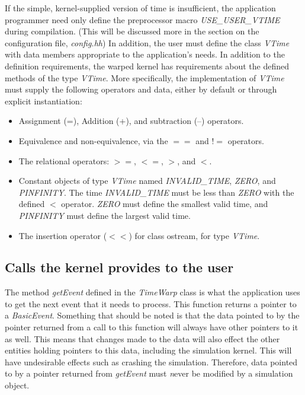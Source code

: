 \documentclass[11pt]{report}
\begin{document}
If the simple, kernel-supplied version of time is insufficient, the
application programmer need only define the preprocessor macro {\it
USE\_USER\_VTIME} during compilation. (This will be discussed more in the
section on the configuration file, {\it config.hh}) In addition, the user
must define the class {\it VTime} with data members appropriate to the
application's needs.  In addition to the definition requirements, the {\sc
warped} kernel has requirements about the defined methods of the type {\it
VTime}.  More specifically, the implementation of {\it VTime} must supply
the following operators and data, either by default or through explicit
instantiation: 

\begin{itemize}

\item
Assignment (=), Addition (+), and subtraction (--) operators.
\item 
Equivalence and non-equivalence, via the $==$ and $!=$ operators.
\item 
The relational operators: $>=$, $<=$, $>$, and $<$.
\item 
Constant objects of type {\it VTime} named {\it INVALID\_TIME}, {\it ZERO},
and {\it PINFINITY}.  The time {\it INVALID\_TIME} must be less than
{\it ZERO} with the defined $<$ operator.  {\it ZERO} must define the
smallest valid time, and {\it PINFINITY} must define the largest valid
time.
\item The insertion operator ($<<$) for class ostream, for type
{\it VTime}.
\end{itemize}

\subsection{Calls the kernel provides to the user}

The method {\it getEvent} defined in the {\it TimeWarp} class is what
the application uses to get the next event that it needs to process.
This function returns a pointer to a {\it BasicEvent}.  Something that
should be noted is that the data pointed to by the pointer returned from
a call to this function will always have other pointers to it as well.
This means that changes made to the data will also effect the other
entities holding pointers to this data, including the simulation kernel.
This will have undesirable effects such as crashing the simulation.
Therefore, data pointed to by a pointer returned from {\it getEvent}
must {\emph never} be modified by a simulation object.
\end{document}
